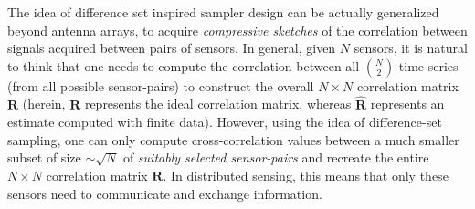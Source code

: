 The idea of difference set inspired sampler design can be actually generalized beyond  antenna arrays, to acquire {\em compressive sketches} of the correlation between signals acquired between pairs of sensors. In general, given $N$ sensors, it is natural to think that one needs to compute the correlation between all $N\choose 2$ time series (from all possible sensor-pairs) to construct the overall $N\times N$ correlation matrix $\mathbf{R}$
(herein, $\mathbf{R}$ represents the ideal correlation matrix, whereas $\mathbf{\hat{R}}$ represents an estimate  computed with finite data).
However, using the idea of difference-set sampling, one can only compute  cross-correlation values between a much smaller subset of size $\sim\sqrt{N}$ of {\em suitably selected sensor-pairs} and recreate the entire $N\times N$ correlation matrix $\mathbf{R}$. In distributed sensing, this  means that only these sensors need to communicate and exchange information.

